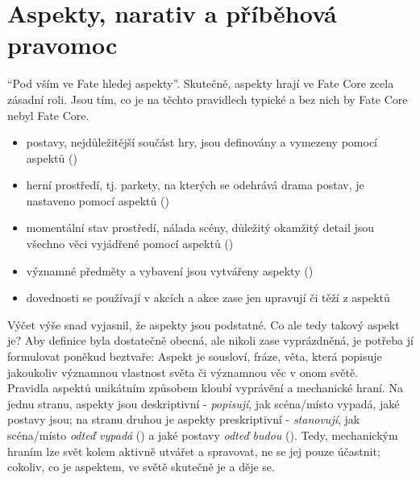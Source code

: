 \documentclass[../main.tex]{subfiles}
\begin{document}
\section{Aspekty, narativ a příběhová pravomoc}
\label{sec:aspekty-narativ-pribeh}

``Pod vším ve Fate hledej aspekty''. Skutečně, aspekty hrají ve Fate Core zcela zásadní roli. Jsou tím, co je na těchto pravidlech typické a bez nich by Fate Core nebyl Fate Core.

\begin{itemize}
\item postavy, nejdůležitější součást hry, jsou definovány a vymezeny pomocí aspektů ()
\item herní prostředí, tj. parkety, na kterých se odehrává drama postav, je nastaveno pomocí aspektů ()
\item momentální stav prostředí, nálada scény, důležitý okamžitý detail jsou všechno věci vyjádřené pomocí aspektů ()
\item významné předměty a vybavení jsou vytvářeny aspekty ()
\item dovednosti se používají v akcích a akce zase jen upravují či těží z aspektů
\end{itemize}

Výčet výše snad vyjasnil, že aspekty jsou podstatné. Co ale tedy takový aspekt je? Aby definice byla dostatečně obecná, ale nikoli zase vyprázdněná, je potřeba jí formulovat poněkud beztvaře: Aspekt je sousloví, fráze, věta, která popisuje jakoukoliv významnou vlastnost světa či významnou věc v onom světě. \\

Pravidla aspektů unikátním způsobem kloubí vyprávění a mechanické hraní. Na jednu stranu, aspekty jsou deskriptivní - \textit{popisují}, jak scéna/místo vypadá, jaké postavy jsou; na stranu druhou je aspekty preskriptivní - \textit{stanovují}, jak scéna/místo \textit{odteď vypadá} () a jaké postavy \textit{odteď budou} (). Tedy, mechanickým hraním lze svět kolem aktivně utvářet a spravovat, ne se jej pouze účastnit; cokoliv, co je aspektem, ve světě skutečně je a děje se. \\
\end{document}
